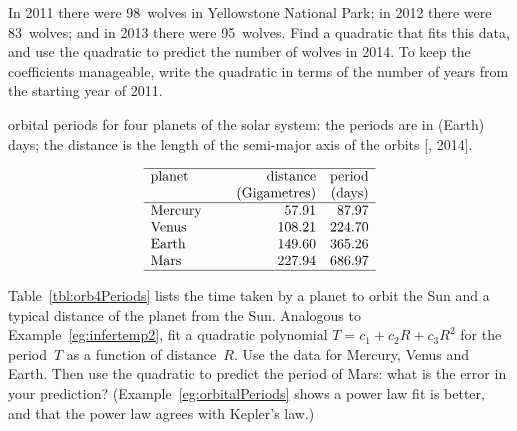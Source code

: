 \begin{exercise} \label{ex:} 
In 2011 there were 98~wolves in Yellowstone National Park; in 2012 there were 83~wolves; and in 2013 there were 95~wolves.
Find a quadratic that fits this data, and use the quadratic to predict the number of wolves in 2014.
To keep the coefficients manageable, write the quadratic in terms of the number of years from the starting year of 2011.
\end{exercise}








\begin{exercise} \label{ex:orb4Periods} 
\begin{table}
\caption{orbital periods for four planets of the solar system: the periods are in (Earth) days; the distance is the length of the semi-major axis of the orbits [, 2014].}
\label{tbl:orb4Periods}
\begin{equation*}
\begin{array}{p{12ex}rr} \hline
planet&\text{distance}&\text{period}\\
&\text{(Gigametres)}&\text{(days)}\\\hline
Mercury& 57.91 & 87.97 \\
Venus& 108.21 & 224.70 \\
Earth& 149.60& 365.26\\
Mars& 227.94& 686.97\\\hline
\end{array}
\end{equation*}
\end{table}%
Table~\ref{tbl:orb4Periods} lists the time taken by a planet to orbit the Sun and a typical distance of the planet from the Sun. 
Analogous to Example~\ref{eg:infertemp2}, fit a quadratic polynomial \(T=c_1+c_2R+c_3R^2\) for the period~\(T\) as a function of distance~\(R\).
Use the data for Mercury, Venus and Earth.
Then use the quadratic to predict the period of Mars: what is the error in your prediction?
(Example~\ref{eg:orbitalPeriods} shows a power law fit is better, and that the power law agrees with Kepler's law.)
\end{exercise}







